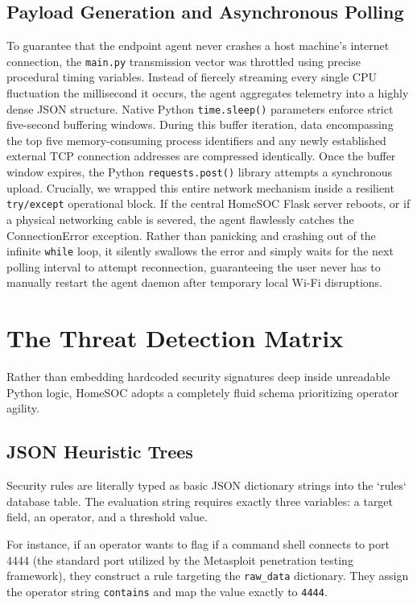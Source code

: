 \documentclass[conference]{IEEEtran}
\begin{document}
\subsection{Payload Generation and Asynchronous Polling}
To guarantee that the endpoint agent never crashes a host machine's internet connection, the \verb|main.py| transmission vector was throttled using precise procedural timing variables. Instead of fiercely streaming every single CPU fluctuation the millisecond it occurs, the agent aggregates telemetry into a highly dense JSON structure. Native Python \verb|time.sleep()| parameters enforce strict five-second buffering windows. During this buffer iteration, data encompassing the top five memory-consuming process identifiers and any newly established external TCP connection addresses are compressed identically. Once the buffer window expires, the Python \verb|requests.post()| library attempts a synchronous upload. Crucially, we wrapped this entire network mechanism inside a resilient \verb|try/except| operational block. If the central HomeSOC Flask server reboots, or if a physical networking cable is severed, the agent flawlessly catches the ConnectionError exception. Rather than panicking and crashing out of the infinite \verb|while| loop, it silently swallows the error and simply waits for the next polling interval to attempt reconnection, guaranteeing the user never has to manually restart the agent daemon after temporary local Wi-Fi disruptions.

\section{The Threat Detection Matrix}

Rather than embedding hardcoded security signatures deep inside unreadable Python logic, HomeSOC adopts a completely fluid schema prioritizing operator agility.

\subsection{JSON Heuristic Trees}
Security rules are literally typed as basic JSON dictionary strings into the `rules` database table. The evaluation string requires exactly three variables: a target field, an operator, and a threshold value.

For instance, if an operator wants to flag if a command shell connects to port 4444 (the standard port utilized by the Metasploit penetration testing framework), they construct a rule targeting the \verb|raw_data| dictionary. They assign the operator string \verb|contains| and map the value exactly to \verb|4444|. 
\end{document}
